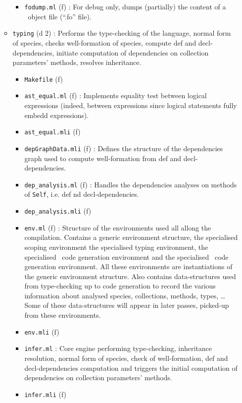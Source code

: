 \begin{itemize}
\begin{itemize}
\begin{itemize}
    \item {\tt fodump.ml} (f) : For debug only, dumps (partially) the
      content of a \focalize\ object file (``.fo'' file).
    \end{itemize}
  \item {\tt typing} (d 2) : Performs the type-checking of the
    language, normal form of species, checks well-formation of
    species, compute def and decl-dependencies, initiate computation
    of dependencies on collection parameters' methods, resolves
    inheritance.
    \begin{itemize}
    \item {\tt Makefile} (f)
    \item {\tt ast\_equal.ml} (f) : Implements equality test between
      logical expressions (indeed, between expressions since logical
      statements fully embedd expressions).
    \item {\tt ast\_equal.mli} (f)
    \item {\tt depGraphData.mli} (f) : Defines the structure of the
      dependencies graph used to compute well-formation from def and
      decl-dependencies.
    \item {\tt dep\_analysis.ml} (f) : Handles the dependencies
      analyses on methods of {\tt Self}, i.e. def nd decl-dependencies.
    \item {\tt dep\_analysis.mli} (f)
    \item {\tt env.ml} (f) : Structure of the environments used all
      allong the compilation. Contains a generic environment
      structure, the specialised scoping environment the specialised
      typing environment, the specialised \ocaml\ code generation
      environment and the specialised \coq\ code generation
      environment. All these environments are instantiations of the
      generic environment structure. Also contains data-structures
      used from type-checking up to code generation to record the
      various information about analysed species, collections,
      methods, types, \ldots Some of these data-structures will appear
      in later passes, picked-up from these environments.
    \item {\tt env.mli} (f)
    \item {\tt infer.ml} : Core engine performing type-checking,
      inheritance resolution, normal form of species, check of
      well-formation, def and decl-dependencies computation and
      triggers the initial computation of dependencies on collection
      parameters' methods.
    \item {\tt infer.mli} (f)

\end{itemize}
\end{itemize}
\end{itemize}
